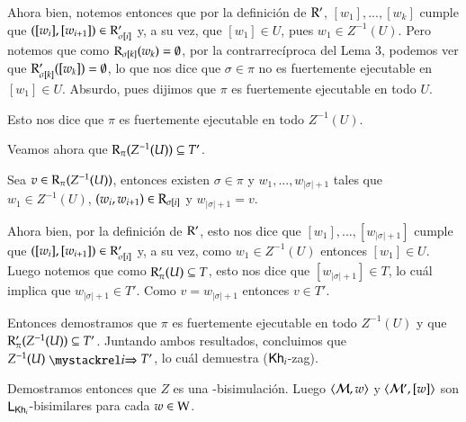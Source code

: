 \begin{demostracion}
\begin{itemize}
        Ahora bien, notemos entonces que por la definición de $\mathrm{R}'$, $[w_1],...,[w_k]$ cumple que $([w_i],[w_{i+1}]) \in \mathrm{R}'_{\sigma[i]}$ y, a su vez, que $[w_1] \in U$, pues $w_1 \in Z^{-1}(U)$. Pero notemos que como $\mathrm{R}_{\sigma[k]}(w_k) = \emptyset$, por la contrarrecíproca del Lema 3, podemos ver que $\mathrm{R}'_{\sigma[k]}([w_k]) = \emptyset$, lo que nos dice que $\sigma \in \pi$ no es fuertemente ejecutable en $[w_1] \in U$. Absurdo, pues dijimos que $\pi$ es fuertemente ejecutable en todo $U$.

        Esto nos dice que $\pi$ es fuertemente ejecutable en todo $Z^{-1}(U)$.

        Veamos ahora que $\mathrm{R}_\pi(Z^{-1}(U)) \subseteq T'$.

        Sea $v \in \mathrm{R}_\pi(Z^{-1}(U))$, entonces existen $\sigma \in \pi$ y $w_1,...,w_{|\sigma|+1}$ tales que $w_1 \in Z^{-1}(U)$, $(w_i,w_{i+1}) \in \mathrm{R}_{\sigma[i]}$ y $w_{|\sigma|+1} = v$. 

        Ahora bien, por la definición de $\mathrm{R}'$, esto nos dice que $[w_1],...,[w_{|\sigma|+1}]$ cumple que $([w_i],[w_{i+1}]) \in \mathrm{R}'_{\sigma[i]}$ y, a su vez, como $w_1 \in Z^{-1}(U)$ entonces $[w_1] \in U$. Luego notemos que como $\mathrm{R}'_\pi(U) \subseteq T$, esto nos dice que $[w_{|\sigma|+1}] \in T$, lo cuál implica que $w_{|\sigma|+1} \in T'$. Como $v = w_{|\sigma|+1}$ entonces $v \in T'$. 

        Entonces demostramos que $\pi$ es fuertemente ejecutable en todo $Z^{-1}(U)$ y que $\mathrm{R}'_\pi(Z^{-1}(U)) \subseteq T'$. Juntando ambos resultados, concluimos que $Z^{-1}(U) \ultsExecAgi T'$, lo cuál demuestra ($\mathsf{Kh}_i$-zag).
    \end{itemize}

    Demostramos entonces que $Z$ es una \KHilogic-bisimulación. Luego $\langle \mathcal{M},w \rangle$ y $\langle \mathcal{M}',[w] \rangle$ son $\mathsf{L}_{\mathsf{Kh}_i}$-bisimilares para cada $w \in \mathrm{W}$.
    
\end{demostracion}

